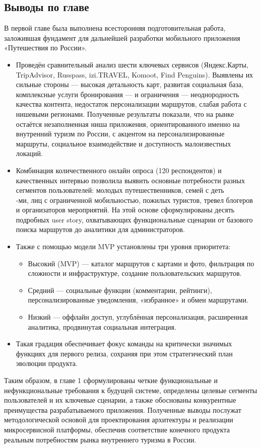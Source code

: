 \subsection*{Выводы по главе}
В первой главе была выполнена всесторонняя подготовительная работа, заложившая фундамент для дальнейшей разработки мобильного приложения «Путешествия по России».
\begin{itemize}
    \item Проведён сравнительный анализ шести ключевых сервисов (Яндекс.Карты, TripAdvisor, Russpass, izi.TRAVEL, Komoot, Find Penguins). Выявлены их сильные стороны — высокая детальность карт, развитая социальная база, комплексные услуги бронирования — и ограничения — неоднородность качества контента, недостаток персонализации маршрутов, слабая работа с нишевыми регионами. Полученные результаты показали, что на рынке остаётся незаполненная ниша приложения, ориентированного именно на внутренний туризм по России, с акцентом на персонализированные маршруты, социальное взаимодействие и доступность малоизвестных локаций.
    \item Комбинация количественного онлайн опроса (120 респондентов) и качественных интервью позволила выявить основные потребности разных сегментов пользователей: молодых путешественников, семей с деть\\-ми, лиц с ограниченной мобильностью, пожилых туристов, тревел блогеров и организаторов мероприятий. На этой основе сформулированы десять подробных user story, охватывающих функциональные сценарии от базового поиска маршрутов до аналитики для администраторов.
    \item Также с помощью модели MVP установлены три уровня приоритета:
    \begin{itemize}
        \item Высокий (MVP) — каталог маршрутов с картами и фото, фильтрация по сложности и инфраструктуре, создание пользовательских маршрутов.
        \item Средний — социальные функции (комментарии, рейтинги), персонализированные уведомления, «избранное» и обмен маршрутами.
        \item Низкий — оффлайн доступ, углублённая персонализация, расширенная аналитика, продвинутая социальная интеграция.
    \end{itemize}
    \item Такая градация обеспечивает фокус команды на критически значимых функциях для первого релиза, сохраняя при этом стратегический план эволюции продукта.
\end{itemize}
\noindent Таким образом, в главе 1 сформулированы четкие функциональные и нефункциональные требования к будущей системе, определены целевые сегменты пользователей и их ключевые сценарии, а также обоснованы конкурентные преимущества разрабатываемого приложения. Полученные выводы послужат методологической основой для проектирования архитектуры и реализации микросервисной платформы, обеспечив соответствие конечного продукта реальным потребностям рынка внутреннего туризма в России.




